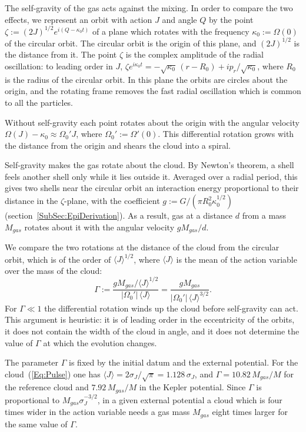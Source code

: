 The self-gravity of the gas acts against the mixing. In order to compare the two effects, we represent an orbit with action $J$ and angle $Q$ by the point $\zeta := (2J)^{1/2} e^{i(Q - \kappa_0 t)}$ of a plane which rotates with the frequency $\kappa_0 := \Omega(0)$ of the circular orbit. The circular orbit is the origin of this plane, and $(2J)^{1/2}$ is the distance from it. The point $\zeta$ is the complex amplitude of the radial oscillation: to leading order in $J$, $\zeta e^{i\kappa_0 t} = -\sqrt{\kappa_0}\,(r - R_0) + i p_r/\sqrt{\kappa_0}$, where $R_0$ is the radius of the circular orbit. In this plane the orbits are circles about the origin, and the rotating frame removes the fast radial oscillation which is common to all the particles.

Without self-gravity each point rotates about the origin with the angular velocity $\Omega(J) - \kappa_0 \approx \Omega_0' J$, where $\Omega_0' := \Omega'(0)$. This differential rotation grows with the distance from the origin and shears the cloud into a spiral.

Self-gravity makes the gas rotate about the cloud. By Newton's theorem, a shell feels another shell only while it lies outside it. Averaged over a radial period, this gives two shells near the circular orbit an interaction energy proportional to their distance in the $\zeta$-plane, with the coefficient $g := G/(\pi R_0^2\kappa_0^{1/2})$ (section~\ref{SubSec:EpiDerivation}). As a result, gas at a distance $d$ from a mass $M_{gas}$ rotates about it with the angular velocity $g M_{gas}/d$.

We compare the two rotations at the distance of the cloud from the circular orbit, which is of the order of $\langle J\rangle^{1/2}$, where $\langle J\rangle$ is the mean of the action variable over the mass of the cloud:
\begin{equation}
\Gamma := \frac{g M_{gas}/\langle J\rangle^{1/2}}{|\Omega_0'|\, \langle J\rangle} = \frac{g M_{gas}}{|\Omega_0'|\, \langle J\rangle^{3/2}}.
\label{Eq:GammaDef}
\end{equation}
For $\Gamma\ll 1$ the differential rotation winds up the cloud before self-gravity can act. This argument is heuristic: it is of leading order in the eccentricity of the orbits, it does not contain the width of the cloud in angle, and it does not determine the value of $\Gamma$ at which the evolution changes.

The parameter $\Gamma$ is fixed by the initial datum and the external potential. For the cloud~(\ref{Eq:Pulse}) one has $\langle J\rangle = 2\sigma_J/\sqrt{\pi} = 1.128\,\sigma_J$, and $\Gamma = 10.82\, M_{gas}/M$ for the reference cloud and $7.92\, M_{gas}/M$ in the Kepler potential. Since $\Gamma$ is proportional to $M_{gas}\sigma_J^{-3/2}$, in a given external potential a cloud which is four times wider in the action variable needs a gas mass $M_{gas}$ eight times larger for the same value of $\Gamma$.


